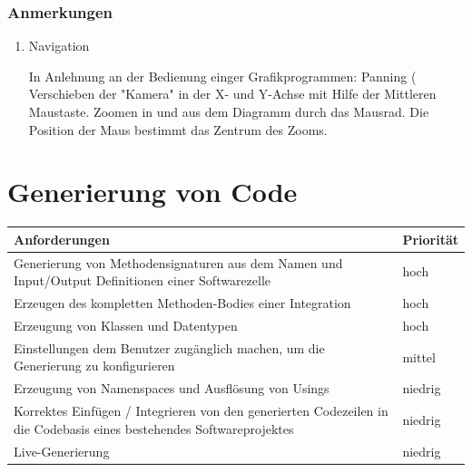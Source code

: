 \documentclass[a4paper,12pt,oneside]{book}
\begin{document}
\subsubsection{Anmerkungen}
\label{sec:orgheadline10}
\begin{enumerate}
\item Navigation
\label{sec:orgheadline9}

In Anlehnung an der Bedienung einger Grafikprogrammen:
Panning ( Verschieben der "Kamera" in
der X- und Y-Achse mit Hilfe der Mittleren Maustaste. Zoomen in und aus dem
Diagramm durch das Mausrad. Die Position der Maus bestimmt das Zentrum des
Zooms.
\end{enumerate}




\section{Generierung von Code}
\label{sec:orgheadline16}

\begin{tabularx}{\textwidth}{X|l}
Anforderungen & Priorität\\
\hline
Generierung von Methodensignaturen aus dem Namen und Input/Output Definitionen einer Softwarezelle & hoch\\
\hline
Erzeugen des kompletten Methoden-Bodies einer Integration & hoch\\
\hline
Erzeugung von Klassen und Datentypen & hoch\\
\hline
Einstellungen  dem Benutzer zugänglich machen, um die Generierung zu konfigurieren & mittel\\
\hline
Erzeugung von Namenspaces und Ausflösung von Usings & niedrig\\
\hline
Korrektes Einfügen / Integrieren von den generierten Codezeilen in die Codebasis eines bestehendes Softwareprojektes & niedrig\\
\hline
Live-Generierung & niedrig\\
\hline
\end{tabularx}
\end{document}

